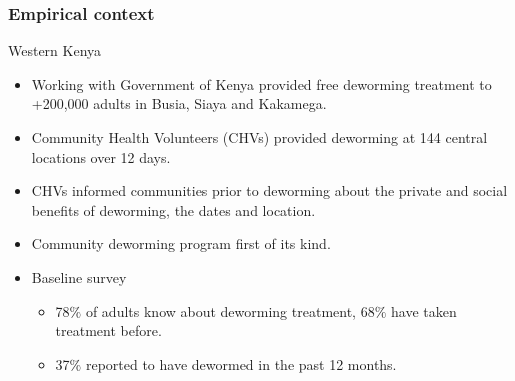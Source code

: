 \documentclass{beamer}
\theoremstyle{plain}
\begin{document}
\begin{frame}[label=slide4]
\frametitle{\large{Empirical context}}
Western Kenya %
\begin{itemize}
\item Working with Government of Kenya provided free deworming treatment to +200,000 adults in Busia, Siaya and Kakamega. %
\item Community Health Volunteers (CHVs) provided deworming at 144 central locations over 12 days. 
\item CHVs informed communities prior to deworming about the private and social benefits of deworming, the dates and location.  %
\hyperlink{slide100}{}
\item Community deworming program first of its kind. 
\item Baseline survey
\begin{itemize}
\item 78$\%$ of adults know about deworming treatment, 68$\%$ have taken treatment before. %
\item 37$\%$ reported to have dewormed in the past 12 months. %
\end{itemize}
\end{itemize}
\end{frame}
\end{document}
